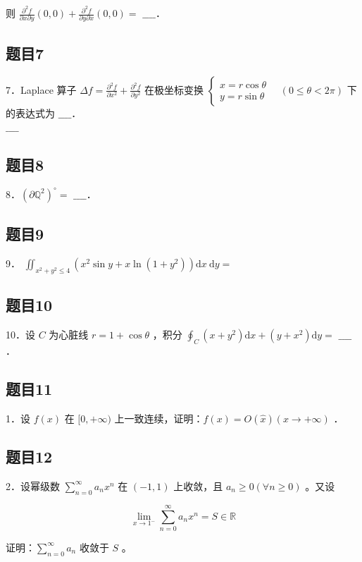 \documentclass{article}
\begin{document}
则 \(\frac{\partial^{2} f}{\partial x \partial y}(0,0)+\frac{\partial^{2} f}{\partial y \partial x}(0,0)=\) \(\_\_\_\_\)．

\subsection{题目7}
7．Laplace 算子 \(\Delta f=\frac{\partial^{2} f}{\partial x^{2}}+\frac{\partial^{2} f}{\partial y^{2}}\) 在极坐标变换 \(\left\{\begin{array}{l}x=r \cos \theta \\ y=r \sin \theta\end{array} \quad(0 \leq \theta<2 \pi)\right.\) 下的表达式为 \(\_\_\_\_\)．\\
\(\_\_\_\_\)

\subsection{题目8}
8．\(\left(\partial \mathbb{Q}^{2}\right)^{\circ}=\) \(\_\_\_\_\)．

\subsection{题目9}
9． \(\iint_{x^{2}+y^{2} \leq 4}\left(x^{2} \sin y+x \ln \left(1+y^{2}\right)\right) \mathrm{d} x \mathrm{~d} y=\)

\subsection{题目10}
10．设 \(C\) 为心脏线 \(r=1+\cos \theta\) ，积分 \(\oint_{C}\left(x+y^{2}\right) \mathrm{d} x+\left(y+x^{2}\right) \mathrm{d} y=\) \(\_\_\_\_\)．

\subsection{题目11}
1．设 \(f(x)\) 在 \([0,+\infty)\) 上一致连续，证明：\(f(x)=O(\hat{x})(x \rightarrow+\infty)\) ．

\subsection{题目12}
2．设幂级数 \(\sum_{n=0}^{\infty} a_{n} x^{n}\) 在 \((-1,1)\) 上收敛，且 \(a_{n} \geq 0(\forall n \geq 0)\) 。又设

\[
\lim _{x \rightarrow 1^{-}} \sum_{n=0}^{\infty} a_{n} x^{n}=S \in \mathbb{R}
\]

证明：\(\sum_{n=0}^{\infty} a_{n}\) 收敛于 \(S\) 。
\end{document}
